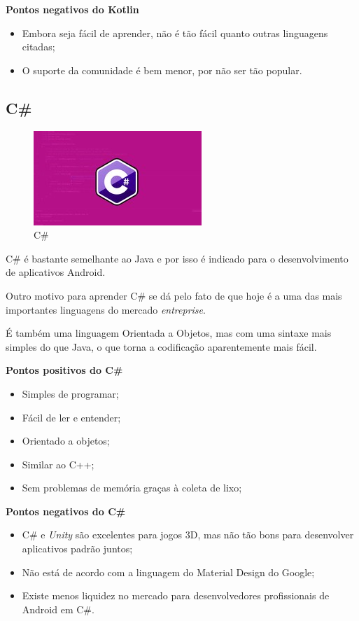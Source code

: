\textbf{Pontos negativos do Kotlin}

\begin{itemize}
    \item Embora seja fácil de aprender, não é tão fácil quanto outras linguagens citadas;
    \item O suporte da comunidade é bem menor, por não ser tão popular.
\end{itemize}

\subsection{C\#}

\begin{figure}[H]
    \centering
    \includegraphics[width=0.3\linewidth]{dados/figuras/c}
    \caption{C\#}
    \label{fig:c}
\end{figure}

C\# é bastante semelhante ao Java e por isso é indicado para o desenvolvimento de aplicativos Android.

Outro motivo para aprender C\# se dá pelo fato de que hoje é a uma das mais importantes linguagens do mercado \textit{entreprise}.

É também uma linguagem Orientada a Objetos, mas com uma sintaxe mais simples do que Java, o que torna a codificação aparentemente mais fácil.

\textbf{Pontos positivos do C\#}

\begin{itemize}
    \item Simples de programar;
    \item Fácil de ler e entender;
    \item Orientado a objetos;
    \item Similar ao C++;
    \item Sem problemas de memória graças à coleta de lixo;
\end{itemize}

\textbf{Pontos negativos do C\#}
\begin{itemize}
    \item C\# e \textit{Unity} são excelentes para jogos 3D, mas não tão bons para desenvolver aplicativos padrão juntos;
    \item Não está de acordo com a linguagem do Material Design do Google;
    \item Existe menos liquidez no mercado para desenvolvedores profissionais de Android em C\#.
\end{itemize}

